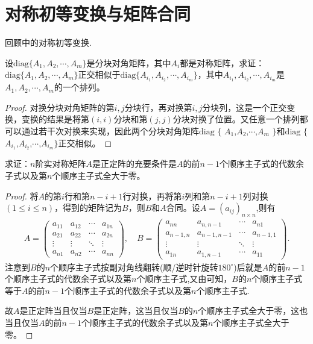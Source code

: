 \documentclass[../../main.tex]{subfiles}
\begin{document}
\section{对称初等变换与矩阵合同}

回顾中的对称初等变换.

\begin{proposition}\label{proposition:分块对称准对角阵正交相似于其任意排列}
设\(\mathrm{diag}\{A_1,A_2,\cdots,A_m\}\)是分块对角矩阵，其中\(A_i\)都是对称矩阵，求证：\(\mathrm{diag}\{A_1,A_2,\cdots,A_m\}\)正交相似于\(\mathrm{diag}\{A_{i_1},A_{i_2},\cdots,A_{i_m}\}\)，其中\(A_{i_1},A_{i_2},\cdots,A_{i_m}\)是\(A_1,A_2,\cdots,A_m\)的一个排列。
\end{proposition}
\begin{proof}
对换分块对角矩阵的第\(i,j\)分块行，再对换第\(i,j\)分块列，这是一个正交变换，变换的结果是将第\((i,i)\)分块和第\((j,j)\)分块对换了位置。又任意一个排列都可以通过若干次对换来实现，因此两个分块对角矩阵$\mathrm{diag}$ $\{$ $A_1$,$A_2$,$\cdots$,$A_m$ $\}$和$\mathrm{diag}$ $\{$ $A_{i_1}$,$A_{i_2}$,$\cdots$,$A_{i_m}\}$正交相似。
\end{proof}

\begin{proposition}
求证：\(n\)阶实对称矩阵\(A\)是正定阵的充要条件是\(A\)的前\(n - 1\)个顺序主子式的代数余子式以及第\(n\)个顺序主子式全大于零。
\end{proposition}
\begin{proof}
将\(A\)的第\(i\)行和第\(n - i + 1\)行对换，再将第\(i\)列和第\(n - i + 1\)列对换\((1\leq i\leq n)\)，得到的矩阵记为\(B\)，则\(B\)和\(A\)合同。设$A=(a_{ij})_{n\times n}$,则有
\begin{align*}
A=
\begin{pmatrix}
a_{11} & a_{12} & \cdots & a_{1n} \\
a_{21} & a_{22} & \cdots & a_{2n} \\
\vdots & \vdots & \ddots & \vdots \\
a_{n1} & a_{n2} & \cdots & a_{nn}
\end{pmatrix},\quad
B=
\begin{pmatrix}
a_{nn} & a_{n,n-1} & \cdots & a_{n1} \\
a_{n-1,n} & a_{n-1,n-1} & \cdots & a_{n-1,1} \\
\vdots & \vdots & \ddots & \vdots \\
a_{1n} & a_{1,n-1} & \cdots & a_{11}
\end{pmatrix}.
\end{align*}
注意到\(B\)的\(n\)个顺序主子式按副对角线翻转(顺/逆时针旋转$180^{\circ}$)后就是\(A\)的前\(n - 1\)个顺序主子式的代数余子式以及第\(n\)个顺序主子式,又由可知，\(B\)的\(n\)个顺序主子式等于\(A\)的前\(n - 1\)个顺序主子式的代数余子式以及第\(n\)个顺序主子式.

故\(A\)是正定阵当且仅当\(B\)是正定阵，这当且仅当\(B\)的\(n\)个顺序主子式全大于零，这也当且仅当\(A\)的前\(n - 1\)个顺序主子式的代数余子式以及第\(n\)个顺序主子式全大于零。
\end{proof}
\end{document}
